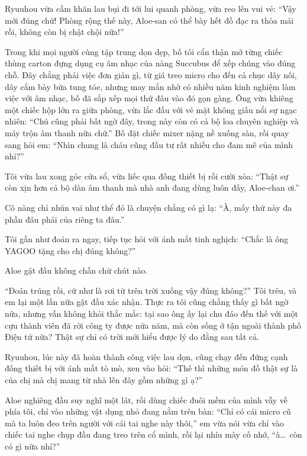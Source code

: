 \documentclass[../main.tex]{subfiles}
\begin{document}
Ryuuhou vừa cầm khăn lau bụi đi tới lui quanh phòng, vừa reo lên vui vẻ: ``Vậy mới đúng chứ! Phòng rộng thế này, Aloe-san có thể bày hết đồ đạc ra thỏa mái rồi, không còn bị chật chội nữa!''

Trong khi mọi người cùng tập trung dọn dẹp, bố tôi cẩn thận mở từng chiếc thùng carton đựng dụng cụ âm nhạc của nàng Succubus để xếp chúng vào đúng chỗ. Đây chẳng phải việc đơn giản gì, từ giá treo micro cho đến cả chục dây nối, dây cắm bày bừa tung tóe, nhưng may mắn nhờ có nhiều năm kinh nghiệm làm việc với âm nhạc, bố đã sắp xếp mọi thứ đâu vào đó gọn gàng. Ông vừa khiêng một chiếc hộp lớn ra giữa phòng, vừa lắc đầu với vẻ mặt không giấu nổi sự ngạc nhiên: ``Chú cũng phải bất ngờ đây, trong này còn có cả bộ loa chuyên nghiệp và máy trộn âm thanh nữa chứ.'' Bố đặt chiếc mixer nặng nề xuống sàn, rồi quay sang hỏi em: ``Nhìn chung là cháu cũng đầu tư rất nhiều cho đam mê của mình nhỉ?''

Tôi vừa lau xong góc cửa sổ, vừa liếc qua đống thiết bị rồi cười xòa: ``Thật sự còn xịn hơn cả bộ dàn âm thanh mà nhà anh đang dùng luôn đấy, Aloe-chan ơi.''

Cô nàng chỉ nhún vai như thể đó là chuyện chẳng có gì lạ: ``À, mấy thứ này đa phần đâu phải của riêng ta đâu.''

Tôi gần như đoán ra ngay, tiếp tục hỏi với ánh mắt tinh nghịch: ``Chắc là ông YAGOO tặng cho chị đúng không?''

Aloe gật đầu không chần chừ chút nào.

``Đoán trúng rồi, cứ như là rơi từ trên trời xuống vậy đúng không?'' Tôi trêu, và em lại một lần nữa gật đầu xác nhận. Thực ra tôi cũng chẳng thấy gì bất ngờ nữa, nhưng vẫn không khỏi thắc mắc: tại sao ông ấy lại chu đáo đến thế với một cựu thành viên đã rời công ty được nửa năm, mà còn sống ở tận ngoài thành phố Điện tử nữa? Thật sự chỉ có trời mới hiểu được lý do đằng sau tất cả.

Ryuuhou, lúc này đã hoàn thành công việc lau dọn, cũng chạy đến đứng cạnh đống thiết bị với ánh mắt tò mò, xen vào hỏi: ``Thế thì những món đồ thật sự là của chị mà chị mang từ nhà lên đây gồm những gì ạ?''

Aloe nghiêng đầu suy nghĩ một lát, rồi dùng chiếc đuôi mềm của mình vẫy về phía tôi, chỉ vào những vật dụng nhỏ đang nằm trên bàn: ``Chỉ có cái micro cũ mà ta luôn đeo trên người với cái tai nghe này thôi,'' em vừa nói vừa chỉ vào chiếc tai nghe chụp đầu đang treo trên cổ mình, rồi lại nhíu mày cố nhớ, ``à\dots\ còn có gì nữa nhỉ?''
\end{document}
